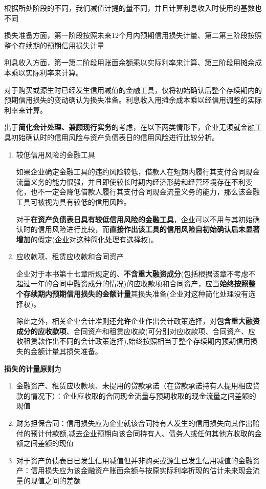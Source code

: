 \documentclass[UTF8,12pt]{ctexart}
\numberwithin{equation}{section} %
\numberwithin{figure}{section}
\numberwithin{table}{section}
\begin{document}
	根据所处阶段的不同，我们减值计提的量不同，并且计算利息收入时使用的基数也不同
	
	损失准备方面，第一阶段按照未来12个月内预期信用损失计量、第二第三阶段按照整个存续期的预期信用损失计量
	
	利息收入方面，第一第二阶段用账面余额乘以实际利率来计算、第三阶段用摊余成本乘以实际利率来计算。
	
	对于购买或源生时已经发生信用减值的金融工具，仅将初始确认后整个存续期内的预期信用损失的变动确认为损失准备。利息收入用摊余成本乘以经信用调整的实际利率来计算。
	
	出于\textbf{简化会计处理、兼顾现行实务}的考虑，在以下两类情形下，企业无须就金融工具初始确认时的信用风险与资产负债表日的信用风险进行比较分析。
	\begin{enumerate}
		\item 较低信用风险的金融工具
		
		如果企业确定金融工具的违约风险较低，借款人在短期内履行其支付合同现金流量义务的能力很强，并且即使较长时期内经济形势和经营环境存在不利变化，也不一定会降低借款人履行其支付合同现金流量义务的能力，那么该金融工具可被视为具有较低的信用风险。
		
		对于\textbf{在资产负债表日具有较低信用风险的金融工具}，企业可以不用与其初始确认时的信用风险进行比较，而\textbf{直接作出该工具的信用风险自初始确认后未显著增加}的假定(企业对这种简化处理有选择权)。
		
		\item 应收款项、租赁应收款和合同资产
		
		企业对于本书第十七章所规定的、\textbf{不含重大融资成分}(包括根据该章不考虑不超过一年的合同中融资成分的情况)的应收款项和合同资产，应当\textbf{始终按照整个存续期内预期信用损失的金额计量}其损失准备(企业对这种简化处理没有选择权)。
		
		除此之外，相关企业会计准则还\textbf{允许}企业作出会计政策选择，对\textbf{包含重大融资成分的应收款项}、合同资产和租赁应收款(可分别对应收款项、合同资产、应收租赁款作出不同的会计政策选择),始终按照相当于整个存续期内预期信用损失的金额计量其损失准备。
	\end{enumerate}
	
	\textbf{损失的计量原则}为
	\begin{enumerate}
		\item 金融资产、租赁应收款项、未提用的贷款承诺（在贷款承诺持有人提用相应贷款的情况下）：企业应收取的合同现金流量与预期收取的现金流量之间差额的现值
		
		\item 财务担保合同：信用损失应为企业就该合同持有人发生的信用损失向其作出赔付的预计付款额,减去企业预期向该合同持有人、债务人或任何其他方收取的金额之间差额的现值
		
		\item 对于资产负债表日已发生信用减值但并非购买或源生已发生信用减值的金融资产：信用损失应为该金融资产账面余额与按原实际利率折现的估计未来现金流量的现值之间的差额
		
	\end{enumerate}
\end{document}
